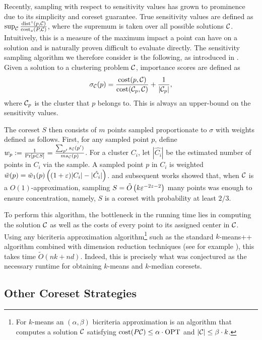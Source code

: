 Recently, sampling with respect to sensitivity values has grown to prominence due to its simplicity and coreset guarantee.  True sensitivity values are defined
as $\sup_{\mathcal C} \frac{\operatorname{dist}^z(p, \mathcal C)}{\operatorname{cost}_z(P, \mathcal C)}$, where the supremum is taken over all possible solutions $\mathcal C$. Intuitively, this is a measure
of the maximum impact a point can have on a solution and is naturally proven difficult to evaluate directly.
The sensitivity sampling algorithm we therefore consider is the following, as introduced in \cite{FeldmanL11}.
Given a solution to a clustering problem $\mathcal C$, importance scores are defined as
\begin{equation}
\label{eq:sensitivity}
\sigma_\mathcal C(p) = \dfrac{\operatorname{cost}(p, \mathcal C)}{\operatorname{cost}(\mathcal C_{p}, \mathcal C)} + \dfrac{1}{|\mathcal C_p|},
\end{equation}
where $\mathcal C_p$ is the cluster that $p$ belongs to. This is always an upper-bound on the sensitivity values.

The coreset $S$ then consists of $m$ points sampled proportionate to $\sigma$ with weights defined as follows. First, for any sampled point $p$, define $w_p :=
\frac{1}{\Pr[p \in S]} = \frac{\sum_{p'} s_\mathcal C(p')}{m s_\mathcal C(p)}$. For a cluster $C_i$, let $|\hat{C_i}|$ be the estimated number of points in $C_i$ via the
sample. A sampled point $p$ in $C_i$ is weighted $\tilde w(p) = \tilde w_1(p) \left( (1+\varepsilon)|C_i|
- |\hat{C_i}|\right)$.  \cite{FeldmanL11} and subsequent works showed that, when $\mathcal C$ is a $O(1)$-approximation, sampling $S = \tilde O\left(
k \varepsilon^{-2z-2}\right)$ many points was enough to ensure concentration, namely, $S$ is a coreset with probability at least $2/3$.

To perform this algorithm, the bottleneck in the running time lies in computing the solution $\mathcal C$ as well as the costs of every point to its assigned
center in $\mathcal C$. Using any bicriteria approximation algorithm\footnote{For $k$-means an $(\alpha,\beta)$ bicriteria approximation is an algorithm that
computes a solution $\mathcal C$ satisfying $\operatorname{cost}(P\mathcal C)\leq \alpha\cdot \text{OPT}$ and $|\mathcal C|\leq \beta\cdot k$.} such as the standard $k$-means++ algorithm
\cite{ArV07} combined with dimension reduction techniques (see for example \cite{BecchettiBC0S19,CohenEMMP15,MakarychevMR19}), this takes time $\tilde O(nk
+nd)$. Indeed, this is precisely what was conjectured as the necessary runtime for obtaining $k$-means and $k$-median coresets.

\subsection{Other Coreset Strategies}
\label{ssec:clustering_prelim}

